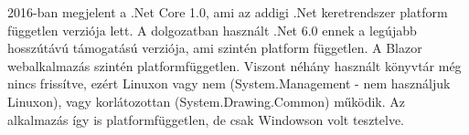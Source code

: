 2016-ban megjelent a .Net Core 1.0, ami az addigi .Net keretrendszer platform független verziója lett. A dolgozatban használt .Net 6.0 ennek a legújabb hosszútávú támogatású verziója, ami szintén platform független. A Blazor webalkalmazás szintén platformfüggetlen. Viszont néhány használt könyvtár még nincs  frissítve, ezért Linuxon vagy nem (System.Management - nem használjuk Linuxon), vagy korlátozottan (System.Drawing.Common) működik. Az alkalmazás így is platformfüggetlen, de csak Windowson volt tesztelve.



